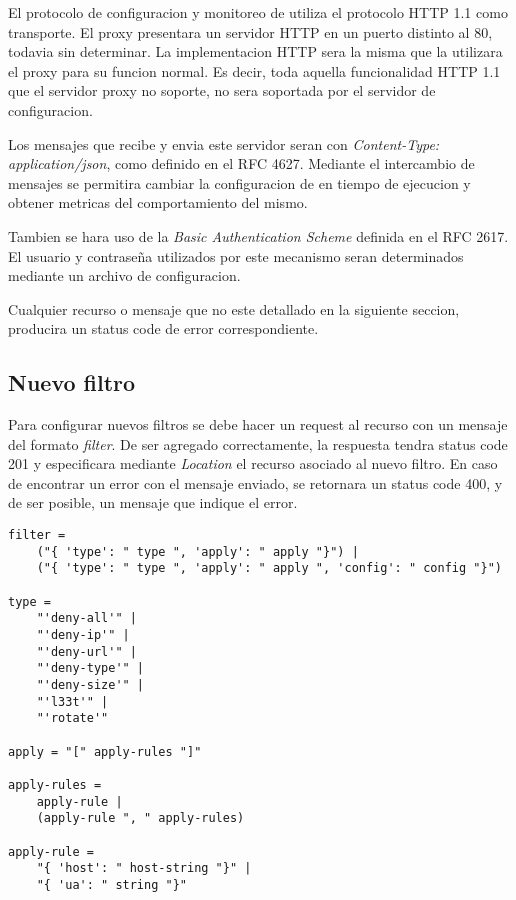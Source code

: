 \documentclass[11pt,a4paper,titlepage]{article}
\begin{document}
El protocolo de configuracion y monitoreo de \duta utiliza el protocolo HTTP 1.1 como transporte.
El proxy presentara un servidor HTTP en un puerto distinto al 80, todavia sin determinar.
La implementacion HTTP sera la misma que la utilizara el proxy para su funcion normal.
Es decir, toda aquella funcionalidad HTTP 1.1 que el servidor proxy no soporte, no sera soportada por el servidor de configuracion.

Los mensajes que recibe y envia este servidor seran con \textit{Content-Type: application/json}, como definido en el RFC 4627.
Mediante el intercambio de mensajes se permitira cambiar la configuracion de \duta en tiempo de ejecucion y obtener metricas del comportamiento del mismo.

Tambien se hara uso de la \textit{Basic Authentication Scheme} definida en el RFC 2617.
El usuario y contraseña utilizados por este mecanismo seran determinados mediante un archivo de configuracion.

Cualquier recurso o mensaje que no este detallado en la siguiente seccion, producira un status code de error correspondiente.

\subsection{Nuevo filtro}
\label{sec:new-filter}
Para configurar nuevos filtros se debe hacer un request  al recurso  con un mensaje del formato \textit{filter}.
De ser agregado correctamente, la respuesta tendra status code 201 y especificara mediante \textit{Location} el recurso asociado al nuevo filtro.
En caso de encontrar un error con el mensaje enviado, se retornara un status code 400, y de ser posible, un mensaje que indique el error.

\begin{verbatim}
filter = 
    ("{ 'type': " type ", 'apply': " apply "}") | 
    ("{ 'type': " type ", 'apply': " apply ", 'config': " config "}")

type = 
    "'deny-all'" |
    "'deny-ip'" |
    "'deny-url'" |
    "'deny-type'" |
    "'deny-size'" |
    "'l33t'" |
    "'rotate'"

apply = "[" apply-rules "]"

apply-rules = 
    apply-rule |
    (apply-rule ", " apply-rules)

apply-rule = 
    "{ 'host': " host-string "}" |
    "{ 'ua': " string "}"

\end{verbatim}
\end{document}
